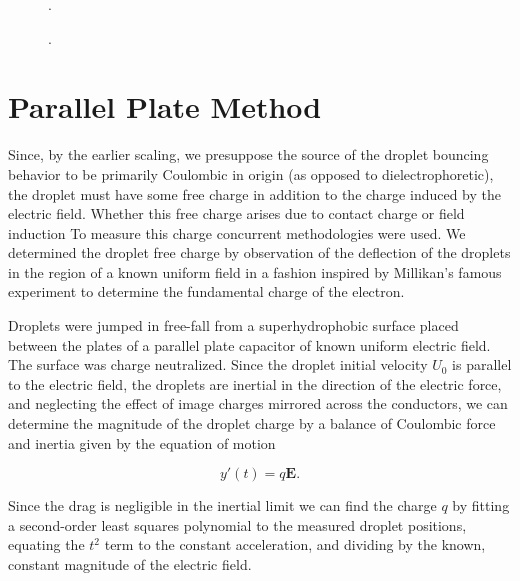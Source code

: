 \documentclass[12pt,a4paper,oneside]{book}
\begin{document}
\begin{figure}[htb]
    \centering
    
    \caption{.\label{fig:contact}}
\end{figure}

\begin{figure}[htb]
    \centering
    
    \caption{.\label{fig:restitution}}
\end{figure}

\newpage

\appendix
\appendixpage
\noappendicestocpagenum
\addappheadtotoc

\chapter{Parallel Plate Method}
\label{sec.drop_charge}
Since, by the earlier scaling, we presuppose the source of the droplet bouncing behavior to be primarily Coulombic in origin (as opposed to dielectrophoretic), the droplet must have some free charge in addition to the charge induced by the electric field. Whether this free charge arises due to contact charge or field induction To measure this charge concurrent methodologies were used. We determined the droplet free charge by observation of the deflection of the droplets in the region of a known uniform field in a fashion inspired by Millikan's famous experiment to determine the fundamental charge of the electron.

Droplets were jumped in free-fall from a superhydrophobic surface placed between the plates of a parallel plate capacitor of known uniform electric field. The surface was charge neutralized. Since the droplet initial velocity $U_0$ is parallel to the electric field, the droplets are inertial in the direction of the electric force, and neglecting the effect of image charges mirrored across the conductors, we can determine the magnitude of the droplet charge by a balance of Coulombic force and inertia given by the equation of motion

\[ y'(t) = q\mathbf{E}. \]

Since the drag is negligible in the inertial limit we can find the charge $q$ by fitting a second-order least squares polynomial to the measured droplet positions, equating the $t^2$ term to the constant acceleration, and dividing by the known, constant magnitude of the electric field.  
\end{document}
